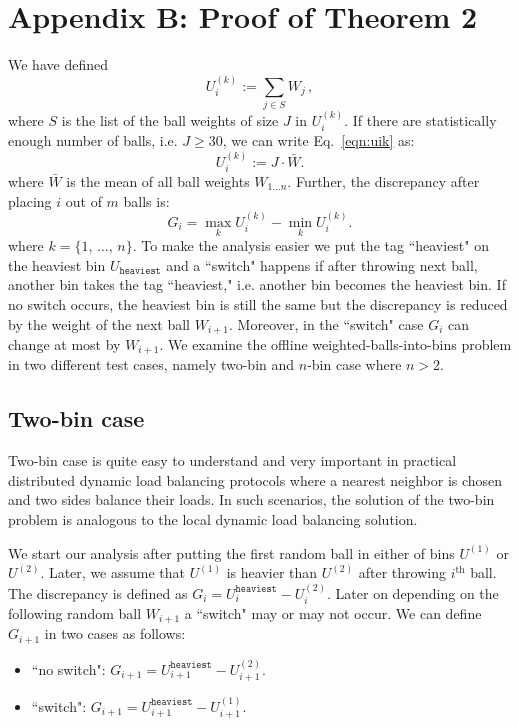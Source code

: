\documentclass[12pt,psfig,a4]{article}
\theoremstyle{plain}
\begin{document}
\section{Appendix B: Proof of Theorem 2}

We have defined
\begin{equation}
 U_i^{(k)}:=\sum_{j\in S} W_j \, , 
 \label{eqn:uik}
\end{equation}
where $S$ is the list of the ball weights of size $J$ in $U_i^{(k)}$. If there are statistically enough number of balls, i.e. $J\geq 30$, we can write Eq.~\ref{eqn:uik} as:
\begin{equation}
	U_i^{(k)}:=J\cdot \bar{W}.
\end{equation}
where $\bar{W}$ is the mean of all ball weights $W_{1\ldots n}$. 
Further, the discrepancy after placing $i$ out of $m$ balls is:
\begin{equation}
G_i=\max_{k} U_i^{(k)} - \min_{k} U_i^{(k)}.
\end{equation} 
where $k=\{1,\,\ldots ,\,n\}$.
To make the analysis easier we put the tag ``heaviest" on the heaviest bin $U_{\texttt{heaviest}}$ and a ``switch" happens if after throwing next ball, another bin takes the tag ``heaviest," i.e. another bin becomes the heaviest bin. If no switch occurs, the heaviest bin is still the same but the discrepancy is reduced by the weight of the next ball $W_{i+1}$. Moreover, in the ``switch" case $G_{i}$ can change at most by $W_{i+1}$. We examine the offline weighted-balls-into-bins problem in two different test cases, namely two-bin and $n$-bin case where $n>2$.

\subsection{Two-bin case}
Two-bin case is quite easy to understand and very important in practical distributed dynamic load balancing protocols where a nearest neighbor is chosen and two sides balance their loads. In such scenarios, the solution of the two-bin problem is analogous to the local dynamic load balancing solution.

We start our analysis after putting the first random ball in either of bins $U^{(1)}$ or $U^{(2)}$. Later, we assume that $U^{(1)}$ is heavier than $U^{(2)}$ after throwing $i^{\text{th}}$ ball. The discrepancy is defined as $G_i=U_i^{\texttt{heaviest}} - U_i^{(2)}$. Later on depending on the following random ball $W_{i+1}$ a ``switch" may or may not occur.  We can define $G_{i+1}$ in two cases as follows:
\begin{itemize}
	\item ``no switch": $G_{i+1}=U_{i+1}^{\texttt{heaviest}} - U_{i+1}^{(2)}$.
	\item ``switch": $G_{i+1}=U_{i+1}^{\texttt{heaviest}} - U_{i+1}^{(1)}$.
\end{itemize} 
\end{document}
